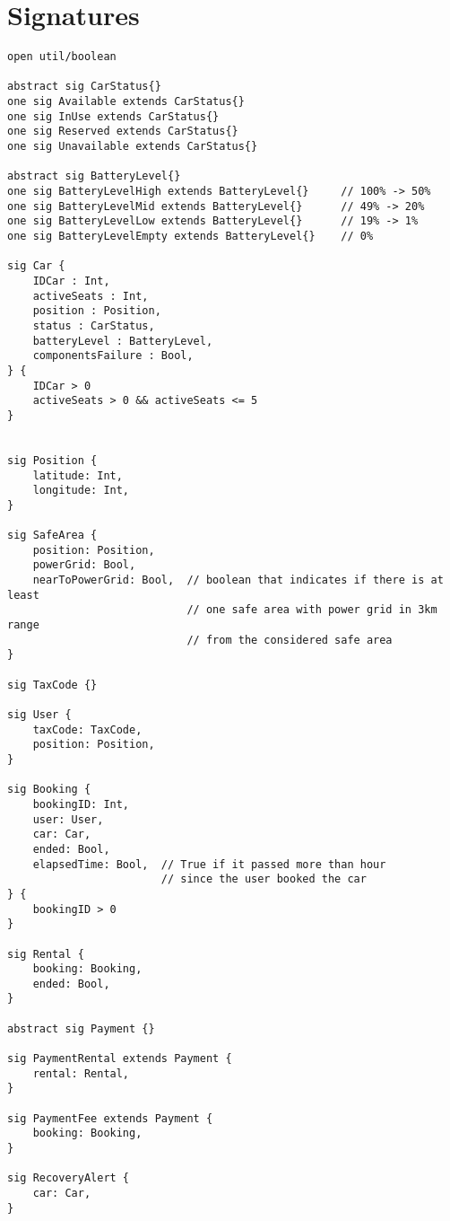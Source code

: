 \section{Signatures}

\lstset{language=alloy}

\begin{lstlisting}
open util/boolean

abstract sig CarStatus{}
one sig Available extends CarStatus{}
one sig InUse extends CarStatus{}
one sig Reserved extends CarStatus{}
one sig Unavailable extends CarStatus{}

abstract sig BatteryLevel{}
one sig BatteryLevelHigh extends BatteryLevel{}		// 100% -> 50%
one sig BatteryLevelMid extends BatteryLevel{}		// 49% -> 20%
one sig BatteryLevelLow extends BatteryLevel{}		// 19% -> 1%
one sig BatteryLevelEmpty extends BatteryLevel{}	// 0%

sig Car {
	IDCar : Int,
	activeSeats : Int,
	position : Position,
	status : CarStatus,
	batteryLevel : BatteryLevel,
	componentsFailure : Bool,
} {
	IDCar > 0
	activeSeats > 0 && activeSeats <= 5
}


sig Position {
	latitude: Int,
	longitude: Int,
}

sig SafeArea {
	position: Position,
	powerGrid: Bool,
	nearToPowerGrid: Bool,	// boolean that indicates if there is at least
							// one safe area with power grid in 3km range
							// from the considered safe area
}

sig TaxCode {}

sig User {
	taxCode: TaxCode,
	position: Position,
}

sig Booking {
	bookingID: Int,
	user: User,
	car: Car,
	ended: Bool,
	elapsedTime: Bool,	// True if it passed more than hour
						// since the user booked the car
} {
	bookingID > 0
}

sig Rental {
	booking: Booking,
	ended: Bool,
} 

abstract sig Payment {}

sig PaymentRental extends Payment {
	rental: Rental,
}

sig PaymentFee extends Payment {
	booking: Booking,
}

sig RecoveryAlert {
	car: Car,
}
\end{lstlisting}